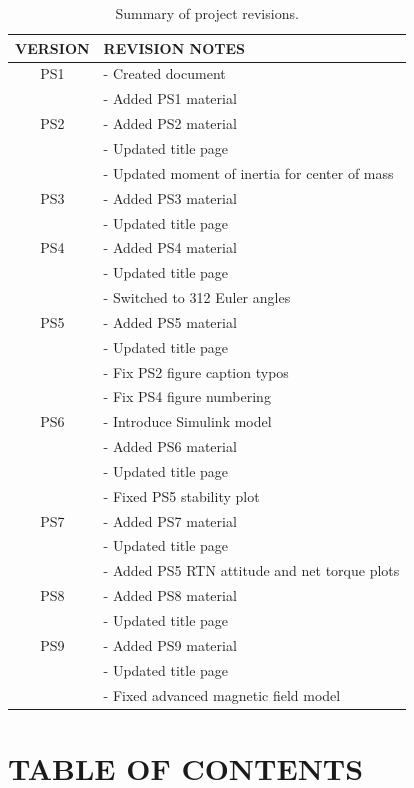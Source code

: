 \documentclass[12pt,a4paper,notitlepage]{article}
\begin{document}
\begin{table}[h!]
\begin{center}
\begin{tabular} [0.9 \textwidth]{cl}
\hline \hline
\multicolumn{1}{c}{VERSION} & \multicolumn{1}{l}{REVISION NOTES} \\
\hline
PS1 & - Created document \\
    & - Added PS1 material \\
\hline
PS2 & - Added PS2 material \\
    & - Updated title page \\
    & - Updated moment of inertia for center of mass \\
\hline
PS3 & - Added PS3 material \\
    & - Updated title page \\
\hline
PS4 & - Added PS4 material \\
    & - Updated title page \\
    & - Switched to 312 Euler angles \\
\hline
PS5 & - Added PS5 material \\
    & - Updated title page \\
    & - Fix PS2 figure caption typos \\
    & - Fix PS4 figure numbering \\
\hline
PS6 & - Introduce Simulink model \\
    & - Added PS6 material \\
    & - Updated title page \\
    & - Fixed PS5 stability plot \\
\hline
PS7 & - Added PS7 material \\
    & - Updated title page \\
    & - Added PS5 RTN attitude and net torque plots \\
\hline
PS8 & - Added PS8 material \\
    & - Updated title page \\
\hline
PS9 & - Added PS9 material \\
    & - Updated title page \\
    & - Fixed advanced magnetic field model \\
\hline \hline
\end{tabular}
	\caption{Summary of project revisions.}
\end{center}
\end{table}
 
\newpage
\section*{\Large TABLE OF CONTENTS}
\makeatletter
{}
\makeatother
\newpage
\end{document}
